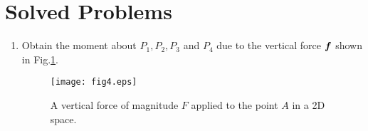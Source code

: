 \documentclass[10pt,a4j]{article}
\begin{document}
\section{Solved Problems}
\begin{enumerate}
\item
	Obtain the moment about $P_1,P_2,P_3$ and $P_4$ due to the vertical
	force $\mbox{\boldmath $f$}$ shown in Fig.\ref{fig:fig4}.
	\begin{figure}[h]
		\begin{center}
		\texttt{[image: fig4.eps]} 
		\end{center}
		\caption{A vertical force of magnitude $F$ applied to the point $A$ in 
		a 2D space.} 
		\label{fig:fig4}
	\end{figure}
	\\


\end{enumerate}
\end{document}
